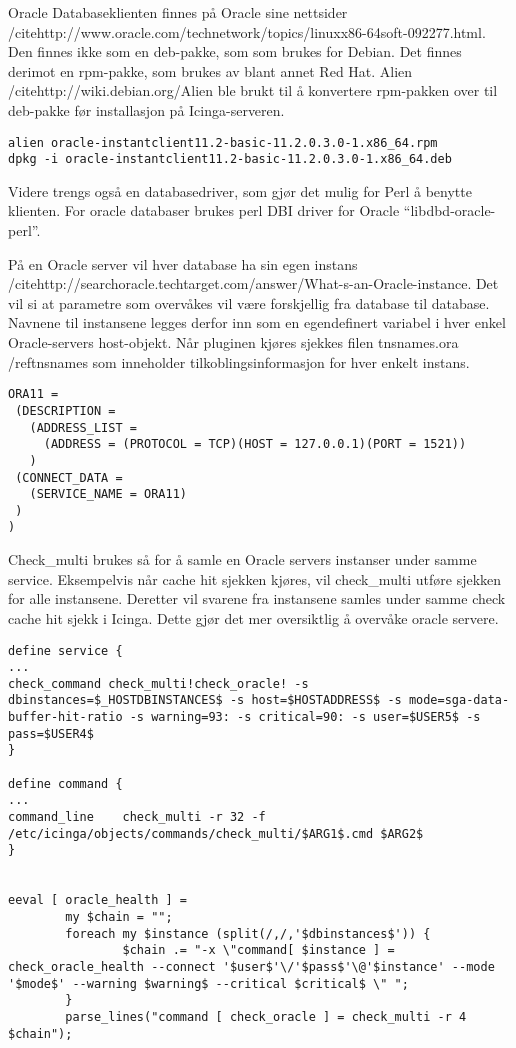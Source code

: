 Oracle
Databaseklienten finnes på Oracle sine nettsider /cite{http://www.oracle.com/technetwork/topics/linuxx86-64soft-092277.html}. Den finnes ikke som en deb-pakke, som som brukes for Debian. Det finnes derimot en rpm-pakke, som brukes av blant annet Red Hat. Alien /cite{http://wiki.debian.org/Alien} ble brukt til å konvertere rpm-pakken over til deb-pakke før installasjon på Icinga-serveren. 
\begin{lstlisting}
alien oracle-instantclient11.2-basic-11.2.0.3.0-1.x86_64.rpm 
dpkg -i oracle-instantclient11.2-basic-11.2.0.3.0-1.x86_64.deb
\end{lstlisting}
Videre trengs også en databasedriver, som gjør det mulig for Perl å benytte klienten. For oracle databaser brukes perl DBI driver for Oracle “libdbd-oracle-perl”.

På en Oracle server vil hver database ha sin egen instans /cite{http://searchoracle.techtarget.com/answer/What-s-an-Oracle-instance}. Det vil si at parametre som overvåkes vil være forskjellig fra database til database. Navnene til instansene legges derfor inn som en egendefinert variabel i hver enkel Oracle-servers host-objekt. Når pluginen kjøres sjekkes filen tnsnames.ora /ref{tnsnames} som inneholder tilkoblingsinformasjon for hver enkelt instans.
\begin{lstlisting}
ORA11 =
 (DESCRIPTION = 
   (ADDRESS_LIST =
     (ADDRESS = (PROTOCOL = TCP)(HOST = 127.0.0.1)(PORT = 1521))
   )
 (CONNECT_DATA =
   (SERVICE_NAME = ORA11)
 )
)
\end{lstlisting}
Check\_multi brukes så for å samle en Oracle servers instanser under samme service. Eksempelvis når cache hit sjekken kjøres, vil check\_multi utføre sjekken for alle instansene. Deretter vil svarene fra instansene samles under samme check cache hit sjekk i Icinga. Dette gjør det mer oversiktlig å overvåke oracle servere.

\begin{lstlisting}
define service {
...
check_command check_multi!check_oracle! -s dbinstances=$_HOSTDBINSTANCES$ -s host=$HOSTADDRESS$ -s mode=sga-data-buffer-hit-ratio -s warning=93: -s critical=90: -s user=$USER5$ -s pass=$USER4$
}

define command {
...
command_line	check_multi -r 32 -f /etc/icinga/objects/commands/check_multi/$ARG1$.cmd $ARG2$
}


eeval [ oracle_health ] =
    	my $chain = "";
    	foreach my $instance (split(/,/,'$dbinstances$')) {
            	$chain .= "-x \"command[ $instance ] = check_oracle_health --connect '$user$'\/'$pass$'\@'$instance' --mode '$mode$' --warning $warning$ --critical $critical$ \" ";
    	}
    	parse_lines("command [ check_oracle ] = check_multi -r 4 $chain");

\end{lstlisting}


